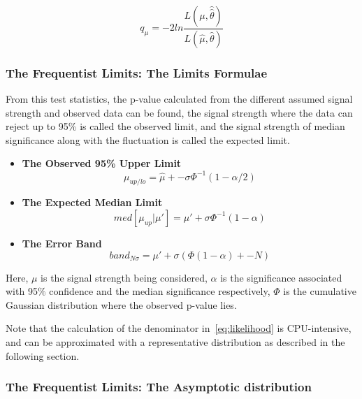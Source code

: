 \begin{equation}
    q_{\mu} = -2 ln \frac{L(\mu, \hat{\hat{\theta}})}{L(\hat{\mu}, \hat{\theta})}
\label{teststats}
\end{equation}


\subsubsection{The Frequentist Limits: The Limits Formulae}
\label{sec:freqlimits}

From this test statistics, the p-value calculated from the different assumed signal strength and observed data can be found, the signal strength where the data can reject up to 95\% is called the observed limit, and the signal strength of median significance along with the fluctuation is called the expected limit. 

\begin{itemize}


\item \textbf{The Observed 95\% Upper Limit}
\begin{equation}
\mu_{up/lo} = \hat{\mu} +- \sigma\Phi^{-1}(1-\alpha/2)
\end{equation}

\item \textbf{The Expected Median Limit}
\begin{equation}
    med[\mu_{up}|\mu'] = \mu' + \sigma\Phi^{-1}(1-\alpha) 
\end{equation}

\item \textbf{The Error Band}
\begin{equation}
    band_{N\sigma} = \mu' + \sigma(\Phi(1-\alpha)+-N)
\end{equation}

\end{itemize}


Here, $\mu$ is the signal strength being considered, $\alpha$ is the significance associated with 95$\%$ confidence and the median significance respectively, $\Phi$ is the cumulative Gaussian distribution where the observed p-value lies.

Note that the calculation of the denominator in~\ref{eq:likelihood} is CPU-intensive, and can be approximated with a representative distribution as described in the following section.


\subsubsection{The Frequentist Limits: The Asymptotic distribution}
\label{sec:asymp}


